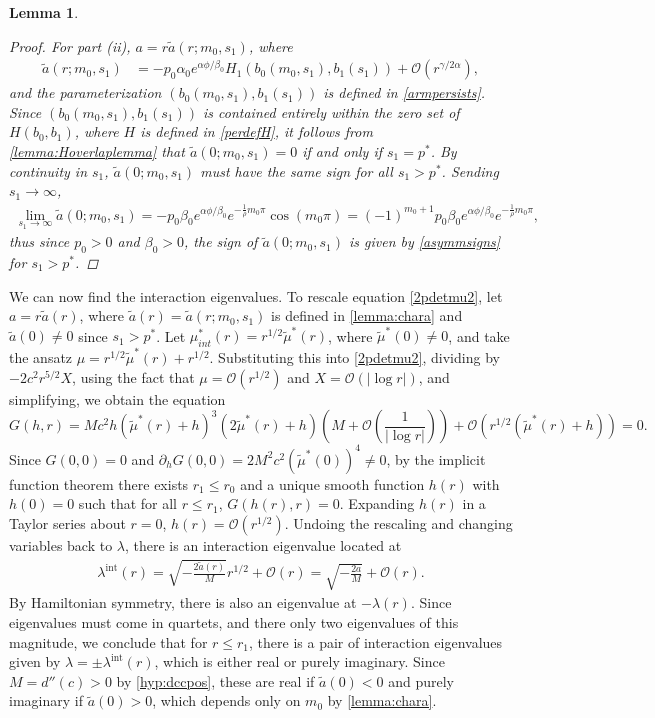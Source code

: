 \documentclass[12pt]{elsarticle}
\theoremstyle{plain}
\newtheorem{lemma}[theorem]{Lemma}
\theoremstyle{definition}
\theoremstyle{remark}
\numberwithin{theorem}{section}
\numberwithin{equation}{section}
\begin{document}
\begin{lemma}
\begin{proof}
For part (ii), $a = r \tilde{a}(r; m_0, s_1)$, where
\begin{align*}
\tilde{a}(r; m_0, s_1) &= -p_0 \alpha_0 e^{\alpha \phi/\beta_0} H_1( b_0(m_0, s_1), b_1(s_1) ) + \mathcal{O}(r^{\gamma/2\alpha}),
\end{align*}
and the parameterization $(b_0(m_0, s_1), b_1(s_1))$ is defined in \cref{armpersists}. Since $(b_0(m_0, s_1), b_1(s_1))$ is contained entirely within the zero set of $H(b_0, b_1)$, where $H$ is defined in \cref{perdefH}, it follows from \cref{lemma:Hoverlaplemma} that $\tilde{a}(0; m_0, s_1) = 0$ if and only if $s_1 = p^*$. By continuity in $s_1$, $\tilde{a}(0; m_0, s_1)$ must have the same sign for all $s_1 > p^*$. Sending $s_1 \rightarrow \infty$,
\begin{align*}
\lim_{s_1 \rightarrow \infty}
\tilde{a}(0; m_0, s_1) = -p_0 \beta_0 e^{\alpha \phi/\beta_0} e^{-\frac{1}{\rho} m_0 \pi} \cos(m_0 \pi) = (-1)^{m_0+1} p_0 \beta_0 e^{\alpha \phi/\beta_0} e^{-\frac{1}{\rho} m_0 \pi},
\end{align*}
thus since $p_0 > 0$ and $\beta_0 > 0$, the sign of $\tilde{a}(0; m_0, s_1)$ is given by \cref{asymmsigns} for $s_1 > p^*$.
\end{proof}
\end{lemma}

We can now find the interaction eigenvalues. To rescale equation \cref{2pdetmu2}, let $a = r \tilde{a}(r)$, where $\tilde{a}(r) = \tilde{a}(r; m_0, s_1)$ is defined in \cref{lemma:chara} and $\tilde{a}(0) \neq 0$ since $s_1 > p^*$. Let $\mu^*_{int}(r) = r^{1/2} \tilde{\mu}^*(r)$, where $\tilde{\mu}^*(0) \neq 0$, and take the ansatz $\mu = r^{1/2} \tilde{\mu}^*(r) + r^{1/2}$. Substituting this into \cref{2pdetmu2}, dividing by $-2 c^2 r^{5/2} X$, using the fact that $\mu = \mathcal{O}(r^{1/2})$ and $X = \mathcal{O}(|\log r|)$, and simplifying, we obtain the equation
\[
G(h, r) = M c^2 h (\tilde{\mu}^*(r) + h)^3 (2 \tilde{\mu}^*(r) + h)
\left( M + \mathcal{O}\left(\frac{1}{|\log r|} \right) \right)
 + \mathcal{O}\left( r^{1/2}(\tilde{\mu}^*(r) + h) \right) = 0.
\]
Since $G(0, 0) = 0$ and $\partial_h G(0, 0) = 2 M^2 c^2 (\tilde{\mu}^*(0))^4 \neq 0$, by the implicit function theorem there exists $r_1 \leq r_0$ and a unique smooth function $h(r)$ with $h(0) = 0$ such that for all $r \leq r_1$, $G(h(r), r) = 0$. Expanding $h(r)$ in a Taylor series about $r = 0$, $h(r) = \mathcal{O}(r^{1/2})$. Undoing the rescaling and changing variables back to $\lambda$, there is an interaction eigenvalue located at 
\begin{align*}
\lambda^{\text{int}}(r) = \sqrt{-\frac{2 \tilde{a}(r)}{M}}r^{1/2} + \mathcal{O}(r) = \sqrt{ -\frac{2 a}{M} } + \mathcal{O}(r).
\end{align*}
By Hamiltonian symmetry, there is also an eigenvalue at $-\lambda(r)$. Since eigenvalues must come in quartets, and there only two eigenvalues of this magnitude, we conclude that for $r \leq r_1$, there is a pair of interaction eigenvalues given by $\lambda = \pm \lambda^{\text{int}}(r)$, which is either real or purely imaginary. Since $M = d''(c) > 0$ by \cref{hyp:dccpos}, these are real if $\tilde{a}(0) < 0$ and purely imaginary if $\tilde{a}(0) > 0$, which depends only on $m_0$ by \cref{lemma:chara}.
\end{document}
